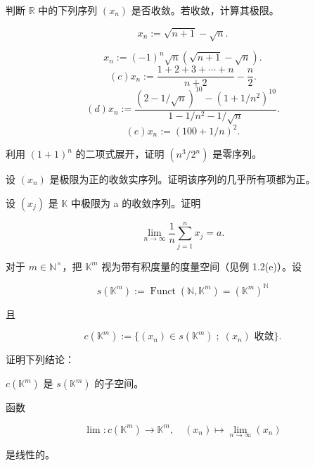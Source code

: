 \exerciseshead

\begin{exercises}
\item

判断 $ \mathbb{R} $ 中的下列序列 $ (x_n) $ 是否收敛。若收敛，计算其极限。

\begin{items}
\item
\[
x_{n}:=\sqrt{n+1}-\sqrt{n}.
\]
\item
\[
x_{n}:=(-1)^{n}\sqrt{n}\left(\sqrt{n+1}-\sqrt{n}\right).
\]
\[
(c)x_{n}:=\frac{1+2+3+\cdots+n}{n+2}-\frac{n}{2}.
\]
\[
(d)x_{n}:=\frac{(2-1/\sqrt{n})^{10}-(1+1/n^{2})^{10}}{1-1/n^{2}-1/\sqrt{n}}.
\]
\[
(e)x_{n}:=(100+1/n)^{2}.
\]
\end{items}

\item

利用 $ (1+1)^{n} $ 的二项式展开，证明 $ (n^{3}/2^{n}) $ 是零序列。

\item

设 $ (x_{n}) $ 是极限为正的收敛实序列。证明该序列的几乎所有项都为正。

\item

设 $ (x_{j}) $ 是 $ \mathbb{K} $ 中极限为 a 的收敛序列。证明

\[
\lim_{n\to\infty}\frac{1}{n}\sum_{j=1}^{n} x_{j}=a.
\]
\item

对于 $ m \in \mathbb{N}^\times $，把 $ \mathbb{K}^m $ 视为带有积度量的度量空间（见例 1.2(e)）。设

\[
s(\mathbb{K}^{m}):=\operatorname{F u n c t}(\mathbb{N},\mathbb{K}^{m})=(\mathbb{K}^{m})^{\mathbb{N}}
\]

且

\[
c(\mathbb{K}^{m}):=\bigl\{(x_{n})\in s(\mathbb{K}^{m})\;;\;(x_{n})\text{ 收敛}\bigr\}.
\]

证明下列结论：

\begin{items}
\item

$ c(\mathbb{K}^m) $ 是 $ s(\mathbb{K}^m) $ 的子空间。

\item

函数

\[
\lim:c(\mathbb{K}^{m})\to\mathbb{K}^{m},\quad(x_{n})\mapsto\lim_{n\to\infty}(x_{n})
\]

是线性的。


\end{items}
\end{exercises}
